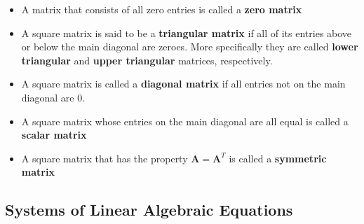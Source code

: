 \documentclass{article}
\begin{document}
\begin{itemize}
  \item A matrix that consists of all zero entries is called a \textbf{zero matrix}

  \item A square matrix is said to be a \textbf{triangular matrix} if all of its entries above or below the main diagonal are zeroes. More specifically they are called \textbf{lower triangular} and \textbf{upper triangular} matrices, respectively.

  \item A square matrix is called a \textbf{diagonal matrix} if all entries not on the main diagonal are 0.

  \item A square matrix whose entries on the main diagonal are all equal is called a \textbf{scalar matrix}

  \item A square matrix that has the property $\mathbf{A} = \mathbf{A}^T$ is called a \textbf{symmetric matrix}
\end{itemize}

\subsection{Systems of Linear Algebraic Equations}
\end{document}
